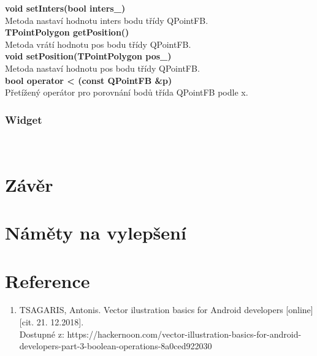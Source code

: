 \documentclass[a4paper, 12pt]{article}
\begin{document}
\textbf{void setInters(bool inters_)}\\
Metoda nastaví hodnotu inters bodu třídy QPointFB.\\

\textbf{TPointPolygon getPosition()}\\
Metoda vrátí hodnotu pos bodu třídy QPointFB.\\

\textbf{void setPosition(TPointPolygon pos_)}\\
Metoda nastaví hodnotu pos bodu třídy QPointFB.\\

\textbf{bool operator < (const QPointFB &p)}\\
Přetížený operátor pro porovnání bodů třída QPointFB podle x.\\

\subsubsection{Widget}

\\


\clearpage
\section{Závěr}


\section{Náměty na vylepšení}


\clearpage
\section{Reference}

\begin{enumerate}
\item TSAGARIS, Antonis. Vector ilustration basics for Android developers [online][cit. 21. 12.2018]. \\
Dostupné z: https://hackernoon.com/vector-illustration-basics-for-android-developers-part-3-boolean-operations-8a0ced922030 \\




\end{enumerate}
\end{document}
